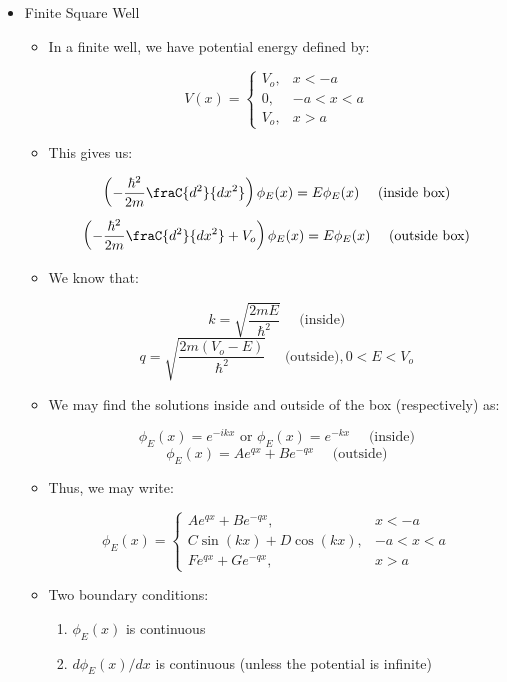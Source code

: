 \begin{itemize}
  \item Finite Square Well

    \begin{itemize}

      \item In a finite well, we have potential energy defined by:

        $$V(x)=\left\{\begin{array}{ll} V_o,& x<-a\\0,&-a<x<a\\ V_o,&x>a\end{array}$$

        \item This gives us:

          $$\left( -\frac{\hbar^2}{2m}\fraC{d^2}{dx^2} \right)\phi_E(x)=E\phi_E(x)\quad\text{ (inside box)}$$
          $$\left( -\frac{\hbar^2}{2m}\fraC{d^2}{dx^2} +V_o\right)\phi_E(x)=E\phi_E(x)\quad\text{ (outside box)}$$

        \item We know that:

          $$k=\sqrt{\frac{2mE}{\hbar^2}}\quad\text{ (inside)}$$
          $$q=\sqrt{\frac{2m(V_o-E)}{\hbar^2}}\quad\text{ (outside)}, 0<E<V_o$$

        \item We may find the solutions inside and outside of the box (respectively) as:

          $$\phi_E(x)=e^{-ikx}\text{ or }\phi_E(x)=e^{-kx}\quad\text{ (inside)}$$
          $$\phi_E(x)=Ae^{qx}+Be^{-qx}\quad\text{ (outside)}$$

        \item Thus, we may write:

          $$\phi_E(x)=\left\{\begin{array}{ll} Ae^{qx}+Be^{-qx},& x<-a\\C\sin(kx)+D\cos(kx),&-a<x<a\\ Fe^{qx}+Ge^{-qx},&x>a\end{array}$$

        \item Two boundary conditions:

          \begin{enumerate}

            \item $\phi_E(x)$ is continuous

            \item $d\phi_E(x)/dx$ is continuous (unless the potential is infinite)


\end{enumerate}
\end{itemize}
\end{itemize}
